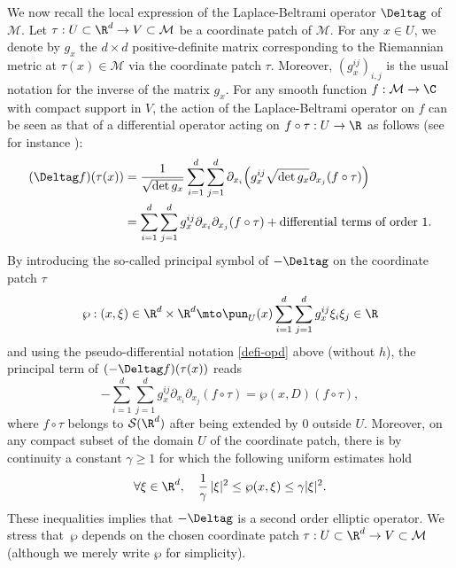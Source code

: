 We now recall the local expression of the Laplace-Beltrami operator $\Deltag$ of $\mathcal{M}$.
Let $\tau:U\subset \R^d \to V\subset \mathcal{M}$ be a coordinate patch of $\mathcal{M}$.
For any $x\in U$, we denote by $g_{x}$ the $d\times d$ positive-definite matrix corresponding to the Riemannian metric at $\tau(x)\in \mathcal{M}$ via the coordinate patch $\tau$.
Moreover, $(g_x^{ij})_{i,j}$ is the usual notation for the inverse of the matrix $g_x$.
For any smooth function $f:\mathcal{M}\to \C$ with compact support in $V$, the action of the Laplace-Beltrami operator on $f$ can be seen as that of a differential operator acting on $f\circ \tau:U\to \R$ as follows (see for instance \cite[p.\,167]{shub-pseudo}):
\begin{align*}
(\Deltag f)(\tau(x))& = \frac{1}{\sqrt{\det g_{x}}}\sum_{i=1}^d \sum_{j=1}^d \partial_{x_i} \Big(g_{x}^{ij} \sqrt{\det g_{x}} \partial_{x_j} (f\circ \tau) \Big) \\
& = \sum_{i=1}^d \sum_{j=1}^d g_x^{ij} \partial_{x_i} \partial_{x_j} (f\circ \tau) +\text{differential terms of order }1.
\end{align*}
By introducing the so-called principal symbol of $-\Deltag$ on the coordinate patch $\tau$
\begin{equation}\label{prin-sy}
\wp:(x,\xi)\in \R^d\times \R^d \mto \pun_{U}(x)\sum_{i=1}^d \sum_{j=1}^d g_x^{ij} \xi_i \xi_j\in\R
\end{equation}
and using the pseudo-differential notation \eqref{defi-opd} above (without $h$), the principal term of $(-\Deltag f)(\tau(x))$ reads
\begin{equation*}
-\sum_{i=1}^d \sum_{j=1}^d g_x^{ij}\partial_{x_i} \partial_{x_j} (f\circ \tau) =\wp(x,D)(f\circ\tau),
\end{equation*}
where $f\circ \tau$ belongs to $\mathcal{S}(\R^d)$ after being extended by $0$ outside $U$.
Moreover, on any compact subset of the domain $U$ of the coordinate patch, there is by continuity a constant $\gamma\geq 1$ for which the following uniform estimates hold
\begin{equation}\label{sym-p2}
\forall \xi\in \R^d,\quad \frac{1}{\gamma}\,|\xi|^2\leq \wp(x,\xi)\leq \gamma|\xi|^2.
\end{equation}
These inequalities implies that $-\Deltag$ is a second order elliptic operator.
We stress that~$\wp$ depends on the chosen coordinate patch $\tau:U\subset \R^d\to V\subset \mathcal{M}$ (although we merely write $\wp$ for simplicity).

